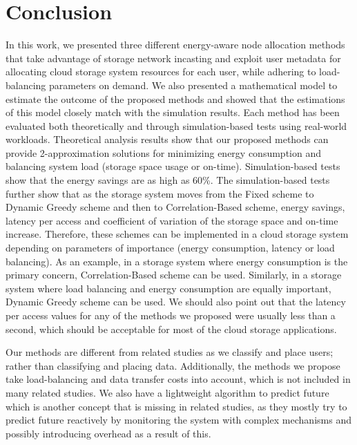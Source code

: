 \documentclass[preprint,12pt]{elsarticle}
\begin{document}
\section{Conclusion}
\label{conclusion}
In this work, we presented three different energy-aware node allocation
methods that take advantage of storage network incasting and exploit user
metadata for allocating cloud storage system resources for each user, while
adhering to load-balancing parameters on demand. We also presented a mathematical
model to estimate the outcome of the proposed methods and showed that the estimations
of this model closely match with the simulation results. Each method has been
evaluated both theoretically and through simulation-based tests using real-world
workloads. Theoretical analysis results show that our proposed methods
can provide 2-approximation solutions for minimizing energy consumption
and balancing system load (storage space usage or on-time). Simulation-based
tests show that the energy savings are as high as 60\%. The simulation-based 
tests further show that as the storage system moves from the Fixed scheme to
Dynamic Greedy scheme and then to Correlation-Based scheme, energy savings, latency
per access and coefficient of variation of the storage space and on-time increase. Therefore,
these schemes can be implemented in a cloud storage system depending on parameters
of importance (energy consumption, latency or load balancing). As an example, in
a storage system where energy consumption is the primary concern, Correlation-Based
scheme can be used. Similarly, in a storage system where load balancing and energy consumption
are equally important, Dynamic Greedy scheme can be used. We should also point
out that the latency per access values for any of the methods we proposed were
usually less than a second, which should be acceptable for most of the cloud
storage applications.

Our methods are different from related studies as we classify and place users; rather
than classifying and placing data. Additionally,
the methods we propose take load-balancing and data transfer costs into account,
which is not included in many related studies. We also have a lightweight algorithm
to predict future which is another concept that is missing in related studies, as
they mostly try to predict future reactively by monitoring the system with complex
mechanisms and possibly introducing overhead as a result of this.
\end{document}
